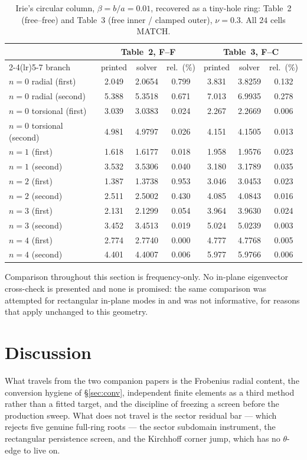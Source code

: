 \documentclass[11pt]{article}
\begin{document}
\begin{table}[htbp]\centering\small
\caption{Irie's circular column, $\beta=b/a=0.01$, recovered as a tiny-hole ring: Table~2 (free--free) and Table~3 (free inner / clamped outer), $\nu=0.3$. All $24$ cells MATCH.}
\label{tab:irie-tinyhole}
\begin{tabular}{lcccccc}
\toprule
& \multicolumn{3}{c}{Table~2, F--F} & \multicolumn{3}{c}{Table~3, F--C}\\
\cmidrule(lr){2-4}\cmidrule(lr){5-7}
branch & printed & solver & rel.\ (\%) & printed & solver & rel.\ (\%)\\
\midrule
$n=0$ radial (first) & 2.049 & 2.0654 & 0.799 & 3.831 & 3.8259 & 0.132 \\
$n=0$ radial (second) & 5.388 & 5.3518 & 0.671 & 7.013 & 6.9935 & 0.278 \\
$n=0$ torsional (first) & 3.039 & 3.0383 & 0.024 & 2.267 & 2.2669 & 0.006 \\
$n=0$ torsional (second) & 4.981 & 4.9797 & 0.026 & 4.151 & 4.1505 & 0.013 \\
$n=1$ (first) & 1.618 & 1.6177 & 0.018 & 1.958 & 1.9576 & 0.023 \\
$n=1$ (second) & 3.532 & 3.5306 & 0.040 & 3.180 & 3.1789 & 0.035 \\
$n=2$ (first) & 1.387 & 1.3738 & 0.953 & 3.046 & 3.0453 & 0.023 \\
$n=2$ (second) & 2.511 & 2.5002 & 0.430 & 4.085 & 4.0843 & 0.016 \\
$n=3$ (first) & 2.131 & 2.1299 & 0.054 & 3.964 & 3.9630 & 0.024 \\
$n=3$ (second) & 3.452 & 3.4513 & 0.019 & 5.024 & 5.0239 & 0.003 \\
$n=4$ (first) & 2.774 & 2.7740 & 0.000 & 4.777 & 4.7768 & 0.005 \\
$n=4$ (second) & 4.401 & 4.4007 & 0.006 & 5.977 & 5.9766 & 0.006 \\
\bottomrule
\end{tabular}
\end{table}

Comparison throughout this section is frequency-only. No in-plane
eigenvector cross-check is presented and none is promised: the same
comparison was attempted for rectangular in-plane modes in
\cite{mccune2026rect} and was not informative, for reasons that apply
unchanged to this geometry.

\FloatBarrier
\section{Discussion}\label{sec:discussion}
What travels from the two companion papers is the Frobenius radial content,
the conversion hygiene of \S\ref{sec:conv}, independent finite elements as a
third method rather than a fitted target, and the discipline of freezing a
screen before the production sweep. What does not travel is the sector
residual bar --- which rejects five genuine full-ring roots --- the sector
subdomain instrument, the rectangular persistence screen, and the Kirchhoff
corner jump, which has no $\theta$-edge to live on.
\end{document}
